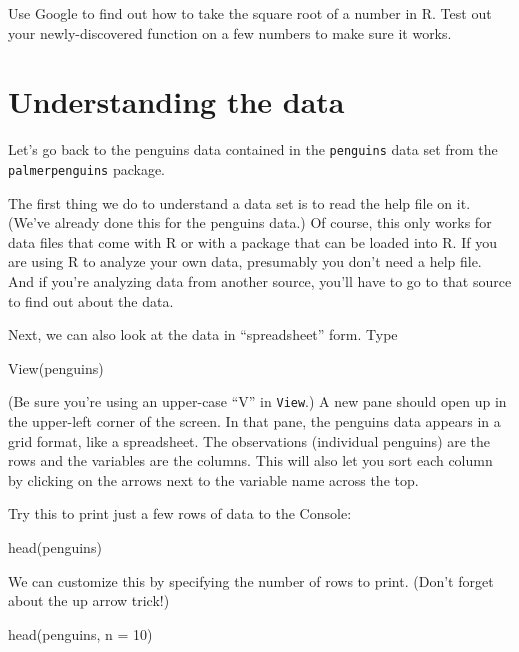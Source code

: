 \documentclass[
]{book}
\newenvironment{Shaded}{\begin{snugshade}}{\end{snugshade}}
\newcommand{\AttributeTok}[1]{\textcolor[rgb]{0.77,0.63,0.00}{#1}}
\newcommand{\DecValTok}[1]{\textcolor[rgb]{0.00,0.00,0.81}{#1}}
\newcommand{\FunctionTok}[1]{\textcolor[rgb]{0.00,0.00,0.00}{#1}}
\newcommand{\NormalTok}[1]{#1}
\begin{document}
Use Google to find out how to take the square root of a number in R. Test out your newly-discovered function on a few numbers to make sure it works.

\hypertarget{intror-understandingdata}{%
\section{Understanding the data}\label{intror-understandingdata}}

Let's go back to the penguins data contained in the \texttt{penguins} data set from the \texttt{palmerpenguins} package.

The first thing we do to understand a data set is to read the help file on it. (We've already done this for the penguins data.) Of course, this only works for data files that come with R or with a package that can be loaded into R. If you are using R to analyze your own data, presumably you don't need a help file. And if you're analyzing data from another source, you'll have to go to that source to find out about the data.

Next, we can also look at the data in ``spreadsheet'' form. Type

\begin{Shaded}
\begin{Highlighting}[]
\FunctionTok{View}\NormalTok{(penguins)}
\end{Highlighting}
\end{Shaded}

(Be sure you're using an upper-case ``V'' in \texttt{View}.) A new pane should open up in the upper-left corner of the screen. In that pane, the penguins data appears in a grid format, like a spreadsheet. The observations (individual penguins) are the rows and the variables are the columns. This will also let you sort each column by clicking on the arrows next to the variable name across the top.

Try this to print just a few rows of data to the Console:

\begin{Shaded}
\begin{Highlighting}[]
\FunctionTok{head}\NormalTok{(penguins)}
\end{Highlighting}
\end{Shaded}

We can customize this by specifying the number of rows to print. (Don't forget about the up arrow trick!)

\begin{Shaded}
\begin{Highlighting}[]
\FunctionTok{head}\NormalTok{(penguins, }\AttributeTok{n =} \DecValTok{10}\NormalTok{)}
\end{Highlighting}
\end{Shaded}
\end{document}
